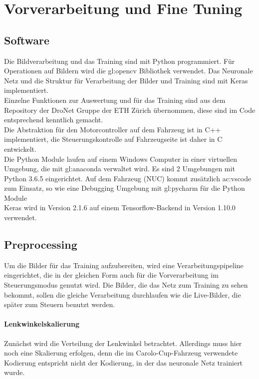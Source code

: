 \section{Vorverarbeitung und Fine Tuning}

\subsection{Software}
Die Bildverarbeitung und das Training sind mit Python programmiert. Für Operationen auf Bildern wird die \gls{gl:opencv} Bibliothek verwendet. Das Neuronale Netz und die Struktur für Verarbeitung der Bilder und Training sind mit Keras implementiert.\\
Einzelne Funktionen zur Auswertung und für das Training sind aus dem Repository der DroNet Gruppe der ETH Zürich übernommen, diese sind im Code entsprechend kenntlich gemacht.\\
Die Abstraktion für den Motorcontroller auf dem Fahrzeug ist in C++ implementiert, die Steuerungskontrolle auf Fahrzeugseite ist daher in C entwickelt.\\
Die Python Module laufen auf einem Windows Computer in einer virtuellen Umgebung, die mit \gls{gl:anaconda} verwaltet wird. Es sind 2 Umgebungen mit Python 3.6.5 eingerichtet. Auf dem Fahrzeug (NUC) kommt zusätzlich \gls{ac:vscode} zum Einsatz, so wie eine Debugging Umgebung mit \gls{gl:pycharm} für die Python Module\\
Keras wird in Version 2.1.6 auf einem Tensorflow-Backend in Version 1.10.0 verwendet.

\subsection{Preprocessing}

Um die Bilder für das Training aufzubereiten, wird eine Verarbeitungspipeline eingerichtet, die in der gleichen Form auch für die Vorverarbeitung im Steuerungsmodus genutzt wird. Die Bilder, die das Netz zum Training zu \glqq sehen \grqq{} bekommt, sollen die gleiche Verarbeitung durchlaufen wie die Live-Bilder, die später zum Steuern benutzt werden.

\paragraph{Lenkwinkelskalierung}
Zunächst wird die Verteilung der Lenkwinkel betrachtet. Allerdings muss hier noch eine Skalierung erfolgen, denn die im Carolo-Cup-Fahrzeug verwendete Kodierung entspricht nicht der Kodierung, in der das neuronale Netz trainiert wurde. 


